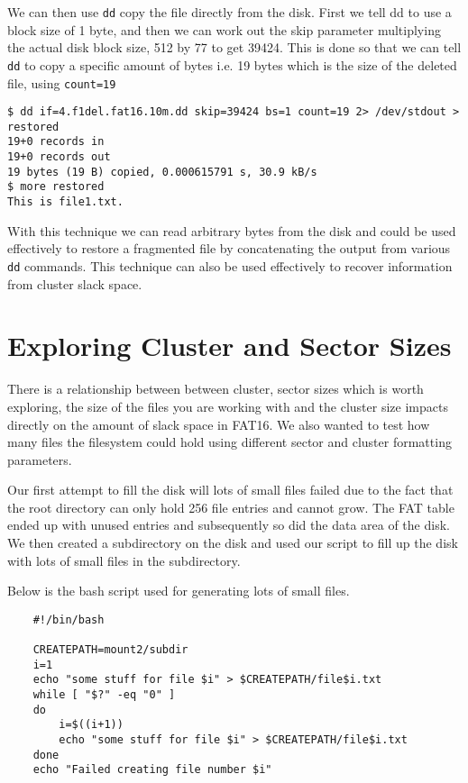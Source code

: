 \documentclass[a4paper,
    11pt,
    normalheadings,
    parindent,
    UKenglish,
    abstracton,
    ]{scrartcl}
\begin{document}
We can then use \texttt{dd} copy the file directly from the disk. First we tell dd to use a block size of 1 byte, and then we can work out the skip parameter multiplying the actual disk block size, 512 by 77 to get 39424. This is done so that we can tell \texttt{dd} to copy a specific amount of bytes i.e. 19 bytes which is the size of the deleted file, using \texttt{count=19}

\begin{verbatim}
$ dd if=4.f1del.fat16.10m.dd skip=39424 bs=1 count=19 2> /dev/stdout > restored
19+0 records in
19+0 records out
19 bytes (19 B) copied, 0.000615791 s, 30.9 kB/s
$ more restored 
This is file1.txt.
\end{verbatim}

With this technique we can read arbitrary bytes from the disk and could be used effectively to restore a fragmented file by concatenating the output from various \texttt{dd} commands. This technique can also be used effectively to recover information from cluster slack space.

\section{Exploring Cluster and Sector Sizes}
There is a relationship between between cluster, sector sizes which is worth exploring, the size of the files you are working with and the cluster size impacts directly on the amount of slack space in FAT16. We also wanted to test how many files the filesystem could hold using different sector and cluster formatting parameters.

Our first attempt to fill the disk will lots of small files failed due to the fact that the root directory can only hold 256 file entries and cannot grow. The FAT table ended up with unused entries and subsequently so did the data area of the disk. We then created a subdirectory on the disk and used our script to fill up the disk with lots of small files in the subdirectory.

Below is the bash script used for generating lots of small files.
\begin{verbatim}
    #!/bin/bash

    CREATEPATH=mount2/subdir
    i=1
    echo "some stuff for file $i" > $CREATEPATH/file$i.txt
    while [ "$?" -eq "0" ]
    do
        i=$((i+1))
        echo "some stuff for file $i" > $CREATEPATH/file$i.txt
    done
    echo "Failed creating file number $i"
\end{verbatim}
\end{document}

